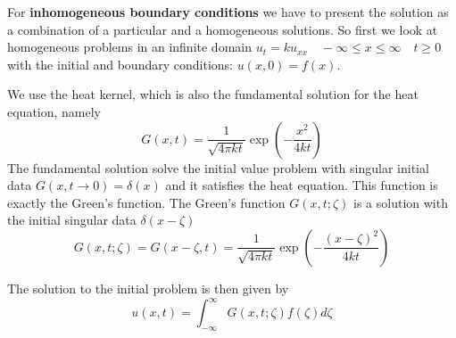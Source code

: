 \documentclass[12pt]{paper}
\begin{document}
For \textbf{inhomogeneous boundary conditions} we have to present the solution as a combination of a particular and a homogeneous solutions. So first we look at homogeneous problems in an infinite domain
$u_t=ku_{xx}\quad -\infty\leq x\leq \infty \quad t\geq 0$ with the initial and boundary conditions: $u(x,0)=f(x)$.

We use the heat kernel, which is also the fundamental solution for the heat equation, namely 
\begin{equation*}
G(x,t)=\frac{1}{\sqrt{4\pi k t}}\exp(-\frac{x^2}{4kt})
\end{equation*}
The fundamental solution solve the initial value problem with singular initial data $G(x,t\rightarrow 0)=\delta(x)$ and it satisfies the heat equation. This function is exactly the Green's function. The Green's function $G(x,t;\zeta)$ is a solution with the initial singular data $\delta(x-\zeta)$
\begin{equation*}
G(x,t;\zeta)=G(x-\zeta,t)=\frac{1}{\sqrt{4\pi k t}}\exp(-\frac{(x-\zeta)^2}{4kt})
\end{equation*}

The solution to the initial problem is then given by 
\begin{equation*}
u(x,t)= \int_{-\infty}^{\infty}G(x,t;\zeta)f(\zeta)d\zeta
\end{equation*}



\end{document}
